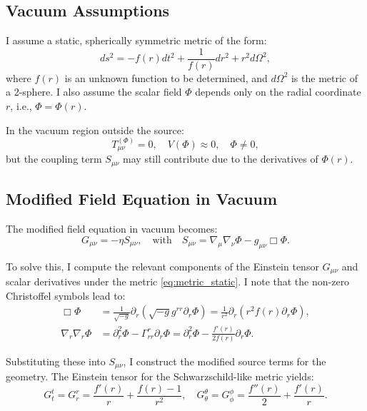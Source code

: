 \documentclass[12pt]{article}
\begin{document}
\subsection{Vacuum Assumptions}

I assume a static, spherically symmetric metric of the form:
\begin{equation}
ds^2 = -f(r) dt^2 + \frac{1}{f(r)} dr^2 + r^2 d\Omega^2,
\label{eq:metric_static}
\end{equation}
where \( f(r) \) is an unknown function to be determined, and \( d\Omega^2 \) is the metric of a 2-sphere. I also assume the scalar field \( \Phi \) depends only on the radial coordinate \( r \), i.e., \( \Phi = \Phi(r) \).

In the vacuum region outside the source:
\[
T_{\mu\nu}^{(\Phi)} = 0, \quad V(\Phi) \approx 0, \quad \Phi \neq 0,
\]
but the coupling term \( S_{\mu\nu} \) may still contribute due to the derivatives of \( \Phi(r) \).

\subsection{Modified Field Equation in Vacuum}

The modified field equation in vacuum becomes:
\begin{equation}
G_{\mu\nu} = -\eta S_{\mu\nu}, \quad \text{with} \quad S_{\mu\nu} = \nabla_\mu \nabla_\nu \Phi - g_{\mu\nu} \Box \Phi.
\end{equation}

To solve this, I compute the relevant components of the Einstein tensor \( G_{\mu\nu} \) and scalar derivatives under the metric \eqref{eq:metric_static}. I note that the non-zero Christoffel symbols lead to:
\begin{align}
\Box \Phi &= \frac{1}{\sqrt{-g}} \partial_r \left( \sqrt{-g} g^{rr} \partial_r \Phi \right) = \frac{1}{r^2} \partial_r \left( r^2 f(r) \partial_r \Phi \right), \\
\nabla_r \nabla_r \Phi &= \partial_r^2 \Phi - \Gamma^r_{rr} \partial_r \Phi = \partial_r^2 \Phi - \frac{f'(r)}{2f(r)} \partial_r \Phi.
\end{align}

Substituting these into \( S_{\mu\nu} \), I construct the modified source terms for the geometry. The Einstein tensor for the Schwarzschild-like metric yields:
\[
G^t_t = G^r_r = \frac{f'(r)}{r} + \frac{f(r)-1}{r^2}, \quad G^\theta_\theta = G^\phi_\phi = \frac{f''(r)}{2} + \frac{f'(r)}{r}.
\]
\end{document}

